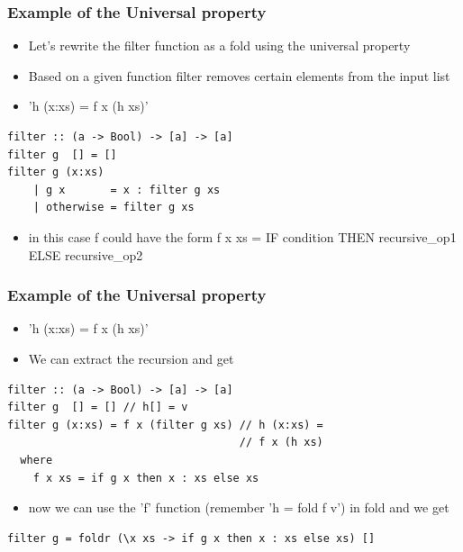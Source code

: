 \documentclass[10pt]{beamer}
\begin{document}
\begin{frame}[fragile]
\frametitle{Example of the Universal property}
\begin{itemize}
\item Let's rewrite the filter function as a fold using the universal property
\item Based on a given function filter removes certain elements from the input list 	
\item 'h (x:xs) = f x (h xs)'
\end{itemize}

\begin{lstlisting}
filter :: (a -> Bool) -> [a] -> [a]
filter g  [] = []
filter g (x:xs)  
    | g x       = x : filter g xs 
    | otherwise = filter g xs
\end{lstlisting}

\begin{itemize}
\item in this case f could have the form f x xs = IF condition THEN recursive\_op1 ELSE recursive\_op2 
\end{itemize}

\end{frame}






\begin{frame}[fragile]
\frametitle{Example of the Universal property}
\begin{itemize}
\item 'h (x:xs) = f x (h xs)'
\item We can extract the recursion and get 
\end{itemize}
\begin{lstlisting}
filter :: (a -> Bool) -> [a] -> [a]
filter g  [] = [] // h[] = v
filter g (x:xs) = f x (filter g xs) // h (x:xs) = 
                                    // f x (h xs)
  where 
    f x xs = if g x then x : xs else xs 
\end{lstlisting}

\begin{itemize}
\item now we can use the 'f' function (remember 'h = fold f v') in fold and we get
\end{itemize}

\begin{lstlisting}
filter g = foldr (\x xs -> if g x then x : xs else xs) []
\end{lstlisting}

\end{frame}
\end{document}
